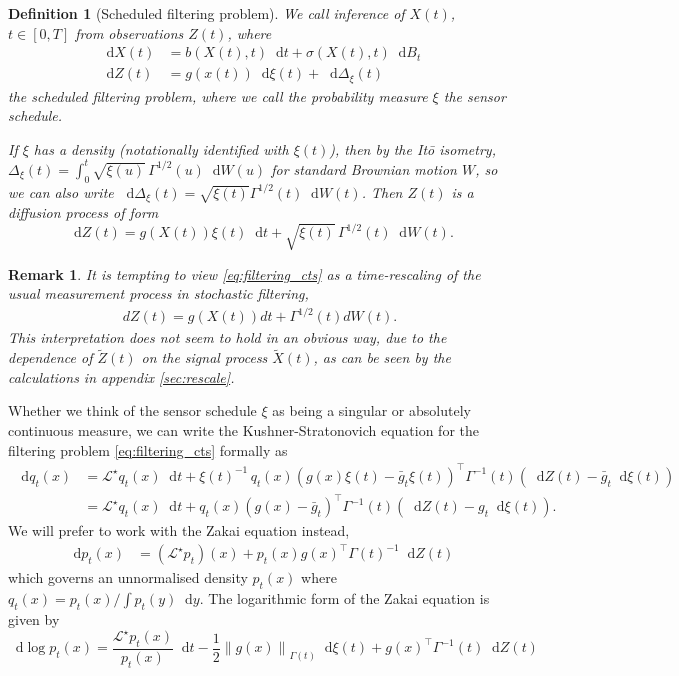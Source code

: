 \documentclass[10pt]{article}
\numberwithin{equation}{section}
\numberwithin{figure}{section}
\newtheorem{defn}[thm]{Definition}
\newtheorem{rem}[thm]{Remark}
\theoremstyle{remark}
\newcommand{\cL}{\mathcal L}
\newcommand{\dd }{\mathop{}\!\mathrm{d}}
\begin{document}
\begin{defn}[Scheduled filtering problem]
    We call inference of $X(t)$, $t\in[0,T]$ from observations $Z(t)$, where
    \begin{align*}        
    \dd X(t) &= b(X(t),t)\dd t + \sigma(X(t),t)\dd B_t\\
    \dd Z(t) &= g(x(t))\dd \xi(t) + \dd\Delta_\xi(t)
    \end{align*}
    the scheduled filtering problem, where we call the probability measure $\xi$ the \textit{sensor schedule}. 
    
    If $\xi$ has a density (notationally identified with $\xi(t)$), then by the It\=o isometry, $\Delta_\xi(t) = \int_0^t\sqrt{\xi(u)}\,\Gamma^{1/2}(u)\dd W(u)$ for standard Brownian motion $W$, so we can also write $\dd\Delta_\xi(t) = \sqrt{\xi(t)}\Gamma^{1/2}(t)\dd W(t)$. Then $Z(t)$ is a diffusion process of form
    \begin{equation}\label{eq:filtering_cts}
    \dd Z(t) = g(X(t))\xi(t)\dd t + \sqrt{\xi(t)}\,\Gamma^{1/2}(t)\dd W(t).
\end{equation}
\end{defn}


\begin{rem}
     It is tempting to view \eqref{eq:filtering_cts} as a time-rescaling of the usual measurement process in stochastic filtering,  
     \begin{align}
        \label{eq:ctsfiltobs}
         dZ(t) = g(X(t))dt + \Gamma^{1/2}(t)dW(t). 
     \end{align}
     This interpretation does not seem to hold in an obvious way, due to the dependence of $\tilde{Z}(t)$ on the signal process $\tilde{X}(t)$, as can be seen by the calculations in appendix \ref{sec:rescale}. 
\end{rem}


Whether we think of the sensor schedule $\xi$ as being a singular or absolutely continuous measure, we can write the Kushner-Stratonovich equation for the filtering problem \eqref{eq:filtering_cts} formally as
\begin{align*}
    \dd q_t(x) &= \cL^\star q_t(x)\dd t + \xi(t)^{-1}\, q_t(x)\left(g(x)\xi(t) - \bar g_t\xi(t) \right)^\top \Gamma^{-1}(t)\left(\dd Z(t) - \bar g_t\dd \xi(t)\right)\\
    &=\cL^\star q_t(x)\dd t + q_t(x)\left(g(x) - \bar g_t \right)^\top \Gamma^{-1}(t)\left(\dd Z(t) -g_t\dd \xi(t)\right).
\end{align*}
We will prefer to work with the Zakai equation instead, 
\begin{align*}
    \dd p_t(x) &= (\cL^\star p_t)(x) + p_t(x)g(x)^\top\Gamma(t)^{-1}\dd Z(t)
\end{align*}
which governs an unnormalised density $p_t(x)$ where $q_t(x) = p_t(x)/\int p_t(y)\dd y$. The logarithmic form of the Zakai equation is given by
\begin{equation}\label{eq:log-Zakai}
    \dd \log p_t(x) = \frac{\cL^\star  p_t(x)}{p_t(x)}\dd t - \frac{1}{2}\left\|g(x)\right\|_{\Gamma(t)}\dd\xi(t)+g(x)^\top \Gamma^{-1}(t)\dd  Z(t)
\end{equation}
\end{document}
